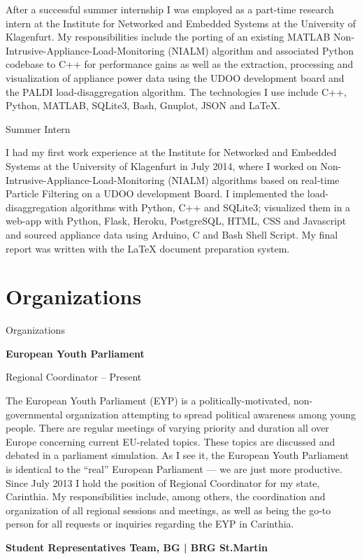 \begin{body}
\begin{detail}
After a successful summer internship I was employed as a part-time research intern at the Institute for Networked and Embedded Systems at the University of Klagenfurt. My responsibilities include the porting of an existing MATLAB Non-Intrusive-Appliance-Load-Monitoring (NIALM) algorithm and associated Python codebase to C++ for performance gains as well as the extraction, processing and visualization of appliance power data using the UDOO development board and the PALDI load-disaggregation algorithm. The technologies I use include C++, Python, MATLAB, SQLite3, Bash, Gnuplot, JSON and \LaTeX{}.
\end{detail}

Summer Intern
\hfill {}

\begin{detail}
I had my first work experience at the Institute for Networked and Embedded Systems at the University of Klagenfurt in July 2014, where I worked on Non-Intrusive-Appliance-Load-Monitoring (NIALM) algorithms based on real-time Particle Filtering on a UDOO development Board. I implemented the load-disaggregation algorithms with Python, C++ and SQLite3; visualized them in a web-app with Python, Flask, Heroku, PostgreSQL, HTML, CSS and Javascript and sourced appliance data using Arduino, C and Bash Shell Script. My final report was written with the \LaTeX{} document preparation system.
\end{detail}


\section{Organizations}
{Organizations}

\textbf{European Youth Parliament}

Regional Coordinator
\hfill {} -- Present

\begin{detail}
The European Youth Parliament (EYP) is a politically-motivated, non-governmental organization attempting to spread political awareness among young people. There are regular meetings of varying priority and duration all over Europe concerning current EU-related topics. These topics are discussed and debated in a parliament simulation. As I see it, the European Youth Parliament is identical to the ``real'' European Parliament --- we are just more productive. Since July 2013 I hold the position of Regional Coordinator for my state, Carinthia. My responsibilities include, among others, the coordination and organization of all regional sessions and meetings, as well as being the go-to person for all requests or inquiries regarding the EYP in Carinthia.
\end{detail}
\vspace{0.4cm}
\textbf{Student Representatives Team, BG | BRG St.Martin}


\end{body}
